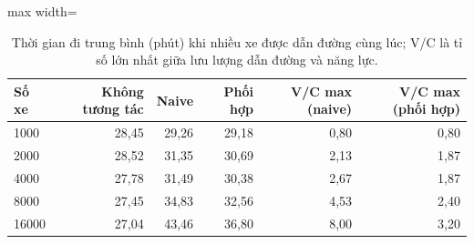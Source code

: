 \begin{table}[!htbp]
\centering
\small
\caption{Thời gian đi trung bình (phút) khi nhiều xe được dẫn đường cùng lúc; V/C là tỉ số lớn nhất giữa lưu lượng dẫn đường và năng lực.}
\label{tab:tab_multiagent}
\begin{adjustbox}{max width=\linewidth}
\begin{tabular}{lrrrrr}
\toprule
Số xe & Không tương tác & Naive & Phối hợp & V/C max (naive) & V/C max (phối hợp) \\
\midrule
1000 & 28{,}45 & 29{,}26 & 29{,}18 & 0{,}80 & 0{,}80 \\
2000 & 28{,}52 & 31{,}35 & 30{,}69 & 2{,}13 & 1{,}87 \\
4000 & 27{,}78 & 31{,}49 & 30{,}38 & 2{,}67 & 1{,}87 \\
8000 & 27{,}45 & 34{,}83 & 32{,}56 & 4{,}53 & 2{,}40 \\
16000 & 27{,}04 & 43{,}46 & 36{,}80 & 8{,}00 & 3{,}20 \\
\bottomrule
\end{tabular}
\end{adjustbox}
\end{table}
